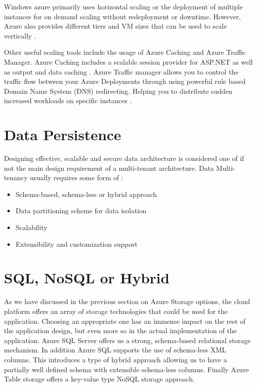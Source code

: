 Windows azure primarily uses horizontal scaling or the deployment of multiple instances for on demand scaling without redeployment or downtime. However, Azure also provides different tiers and VM sizes that can be used to scale vertically \cite{Betts2012-ad}.
 
Other useful scaling tools include the usage of Azure Caching and Azure Traffic Manager. Azure Caching includes a scalable session provider for ASP.NET as well as output and data caching \cite{Microsoft_Corporation_undated-ej}. Azure Traffic manager allows you to control the traffic flow between your Azure Deployments through using powerful rule based Domain Name System (DNS) redirecting. Helping you to distribute sudden increased workloads on specific instances \cite{Betts2012-ad}.

\section{Data Persistence}

Designing effective, scalable and secure data architecture is considered one of if not the main design requirement of a multi-tenant architecture.
Data Multi-tenancy  usually requires some form of \cite{Betts2012-ad}:

\begin{itemize}
\item Schema-based, schema-less or hybrid approach
\item Data partitioning scheme for data isolation
\item Scalability
\item Extensibility and customization support
\end{itemize}


\section{SQL, NoSQL or Hybrid}

As we have discussed in the previous section on Azure Storage options, the cloud platform offers an array of storage technologies that could be used for the application. Choosing an appropriate one has an immense impact on the rest of the application design, but even more so in the actual implementation of the application. Azure SQL Server offers us a strong, schema-based relational storage mechanism. In addition Azure SQL supports the use of schema-less XML columns. This introduces a type of hybrid approach allowing us to have a partially well defined schema with extensible schema-less columns. Finally Azure Table storage offers a key-value type NoSQL storage approach.
 
